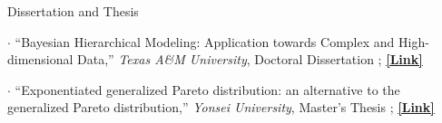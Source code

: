 \documentclass[
	11pt, %
]{resume} %
\begin{document}
\begin{rSection}{Dissertation and Thesis}
\item[$\cdot$] ``Bayesian Hierarchical Modeling: Application towards Complex and High-dimensional Data,''
\textit{Texas A\&M University}, Doctoral Dissertation
 ;
\href{https://oaktrust.library.tamu.edu/handle/1969.1/195691}{\underline{\textbf{[Link]}}}
\item[$\cdot$] ``Exponentiated generalized Pareto distribution: an alternative to the generalized Pareto distribution,''
\textit{Yonsei University}, Master's Thesis
;
\href{https://library.yonsei.ac.kr/search/detail/CAT000001777455?briefLink=/main/searchBrief?q=Seyoon+lee}{\underline{\textbf{[Link]}}}
\end{rSection}


\end{document}
